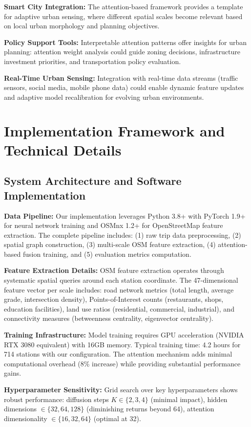 \documentclass{article}
\begin{document}
\textbf{Smart City Integration:} The attention-based framework provides a template for adaptive urban sensing, where different spatial scales become relevant based on local urban morphology and planning objectives.

\textbf{Policy Support Tools:} Interpretable attention patterns offer insights for urban planning: attention weight analysis could guide zoning decisions, infrastructure investment priorities, and transportation policy evaluation.

\textbf{Real-Time Urban Sensing:} Integration with real-time data streams (traffic sensors, social media, mobile phone data) could enable dynamic feature updates and adaptive model recalibration for evolving urban environments.

\section{Implementation Framework and Technical Details}

\subsection{System Architecture and Software Implementation}
\textbf{Data Pipeline:} Our implementation leverages Python 3.8+ with PyTorch 1.9+ for neural network training and OSMnx 1.2+ for OpenStreetMap feature extraction. The complete pipeline includes: (1) raw trip data preprocessing, (2) spatial graph construction, (3) multi-scale OSM feature extraction, (4) attention-based fusion training, and (5) evaluation metrics computation.

\textbf{Feature Extraction Details:} OSM feature extraction operates through systematic spatial queries around each station coordinate. The 47-dimensional feature vector per scale includes: road network metrics (total length, average grade, intersection density), Points-of-Interest counts (restaurants, shops, education facilities), land use ratios (residential, commercial, industrial), and connectivity measures (betweenness centrality, eigenvector centrality).

\textbf{Training Infrastructure:} Model training requires GPU acceleration (NVIDIA RTX 3080 equivalent) with 16GB memory. Typical training time: 4.2 hours for 714 stations with our configuration. The attention mechanism adds minimal computational overhead (8\% increase) while providing substantial performance gains.

\textbf{Hyperparameter Sensitivity:} Grid search over key hyperparameters shows robust performance: diffusion steps $K \in \{2,3,4\}$ (minimal impact), hidden dimensions $\in \{32,64,128\}$ (diminishing returns beyond 64), attention dimensionality $\in \{16,32,64\}$ (optimal at 32).
\end{document}
